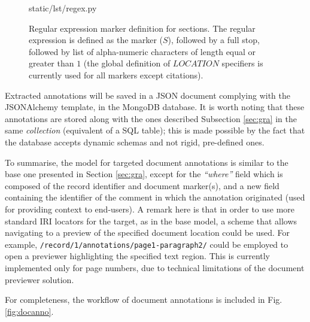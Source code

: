 \begin{figure}[!ht]
  
    {static/lst/regex.py}
    \caption[Regular expression marker definition for sections]
            {Regular expression marker definition for sections. The regular
             expression is defined as the marker ($S$), followed by a full stop,
             followed by list of alpha-numeric characters of length equal or
             greater than $1$ (the global definition of $LOCATION$ specifiers
             is currently used for all markers except citations).}
    \label{lst:regex}
\end{figure}

\newpage

Extracted annotations will be saved in a JSON document complying with the
JSONAlchemy template, in the MongoDB database. It is worth noting that these
annotations are stored along with the ones described Subsection \ref{sec:gra}
in the same \textit{collection} (equivalent of a SQL table); this is made
possible by the fact that the database accepts dynamic schemas and not rigid,
pre-defined ones.

To summarise, the model for targeted document annotations is similar to the
base one presented in Section \ref{sec:gra}, except for the \textit{``where''}
field which is composed of the record identifier and document marker(s), and a
new field containing the identifier of the comment in which the annotation
originated (used for providing context to end-users). A remark here is that in
order to use more standard IRI locators for the target, as in the base model, a
scheme that allows navigating to a preview of the specified document location
could be used.  For example, \texttt{/record/1/annotations/page1-paragraph2/}
could be employed to open a previewer highlighting the specified text region.
This is currently implemented only for page numbers, due to technical
limitations of the document previewer solution.

For completeness, the workflow of document annotations is included in Fig.
\ref{fig:docanno}.

